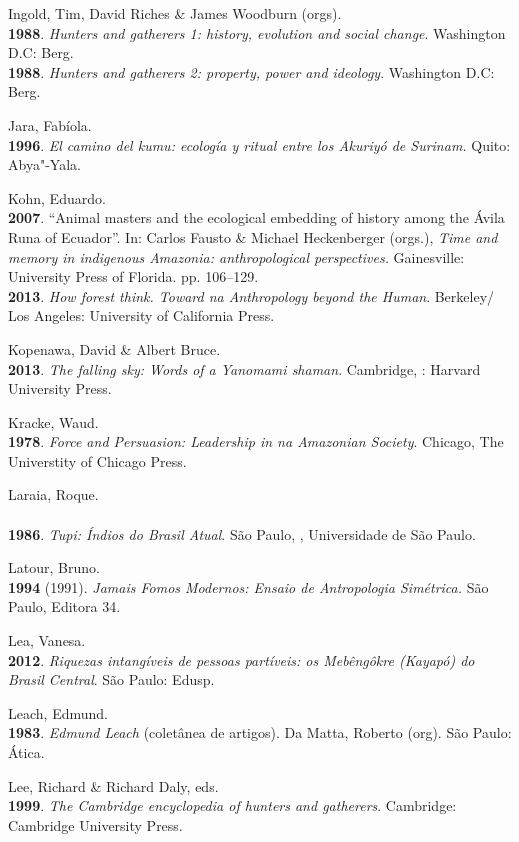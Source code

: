 \begin{Parskip}
Ingold, Tim, David Riches \& James Woodburn (orgs).\\
\textbf{1988}. \emph{Hunters and gatherers 1: history, evolution and
social change}. Washington D.C: Berg.\\
\textbf{1988}. \emph{Hunters and gatherers 2: property, power and
ideology}. Washington D.C: Berg.

Jara, Fabíola.\\
\textbf{1996}. \emph{El camino del kumu: ecología y ritual entre los
Akuriyó de Surinam.} Quito: Abya"-Yala.

Kohn, Eduardo.\\
\textbf{2007}. ``Animal masters and the ecological embedding of history
among the Ávila Runa of Ecuador''. In: Carlos Fausto \& Michael
Heckenberger (orgs.), \emph{Time and memory in indigenous Amazonia:
anthropological perspectives.} Gainesville: University Press of Florida.
pp. 106--129.\\
\textbf{2013}. \emph{How forest think. Toward na Anthropology beyond the
Human}. Berkeley/ Los Angeles: University of California Press.

Kopenawa, David \& Albert Bruce.\\
\textbf{2013}. \emph{The falling sky: Words of a Yanomami shaman}.
Cambridge, : Harvard University Press.

Kracke, Waud.\\
\textbf{1978}. \emph{Force and Persuasion: Leadership in na Amazonian
Society}. Chicago, The Universtity of Chicago Press.

Laraia, Roque.\\
\\\textbf{1986}. \emph{Tupi: Índios do Brasil Atual}. São Paulo, ,
Universidade de São Paulo.

Latour, Bruno.\\
\textbf{1994} (1991). \emph{Jamais Fomos Modernos: Ensaio de
Antropologia Simétrica.} São Paulo, Editora 34.

Lea, Vanesa.\\
\textbf{2012}. \emph{Riquezas intangíveis de pessoas partíveis: os
Mebêngôkre (Kayapó) do Brasil Central}. São Paulo: Edusp.

Leach, Edmund.\\
\textbf{1983}. \emph{Edmund Leach} (coletânea de artigos). Da Matta,
Roberto (org). São Paulo: Ática.

Lee, Richard \& Richard Daly, eds.\\
\textbf{1999}. \emph{The Cambridge encyclopedia of hunters and
gatherers}. Cambridge: Cambridge University Press.


\end{Parskip}
